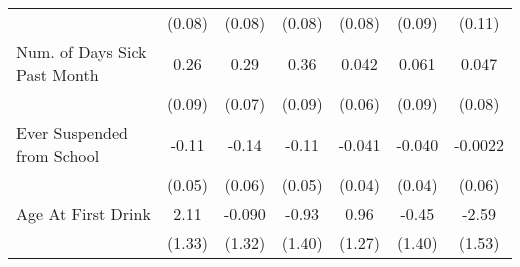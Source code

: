 {\begin{tabular}{l*{6}{c}}
            &      (0.08)         &      (0.08)         &      (0.08)         &      (0.08)         &      (0.09)         &      (0.11)         \\
\addlinespace
Num. of Days Sick Past Month&        0.26\sym{**} &        0.29\sym{***}&        0.36\sym{***}&       0.042         &       0.061         &       0.047         \\
            &      (0.09)         &      (0.07)         &      (0.09)         &      (0.06)         &      (0.09)         &      (0.08)         \\
\addlinespace
Ever Suspended from School&       -0.11\sym{*}  &       -0.14\sym{*}  &       -0.11\sym{*}  &      -0.041         &      -0.040         &     -0.0022         \\
            &      (0.05)         &      (0.06)         &      (0.05)         &      (0.04)         &      (0.04)         &      (0.06)         \\
\addlinespace
Age At First Drink&        2.11         &      -0.090         &       -0.93         &        0.96         &       -0.45         &       -2.59         \\
            &      (1.33)         &      (1.32)         &      (1.40)         &      (1.27)         &      (1.40)         &      (1.53)         \\
\bottomrule
\end{tabular}
}
